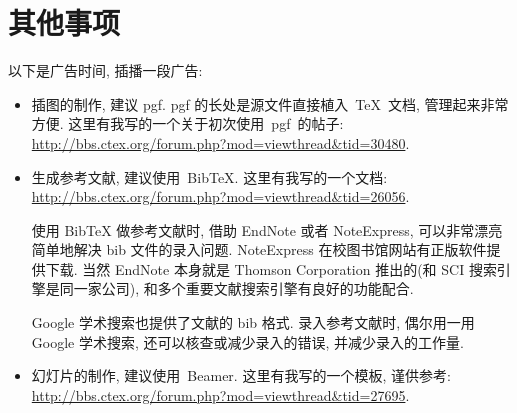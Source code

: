 \documentclass{WHUMaster}   %
\begin{document}

%







\chapter{其他事项}
以下是广告时间, 插播一段广告:
\begin{itemize}
		\item 插图的制作, 建议 pgf.
					pgf 的长处是源文件直接植入~\TeX~文档, 管理起来非常方便.
		这里有我写的一个关于初次使用~pgf~的帖子:\\    \url{http://bbs.ctex.org/forum.php?mod=viewthread&tid=30480}.
		\item 生成参考文献, 建议使用~BibTeX.  这里有我写的一个文档: \\
		\url{http://bbs.ctex.org/forum.php?mod=viewthread&tid=26056}.

			{\kaishu 使用 BibTeX{} 做参考文献时,
			借助 EndNote 或者 NoteExpress, 可以非常漂亮简单地解决 bib 文件的录入问题.
			NoteExpress 在校图书馆网站有正版软件提供下载.
			当然 EndNote 本身就是 Thomson Corporation 推出的(和 SCI 搜索引擎是同一家公司),
			和多个重要文献搜索引擎有良好的功能配合.

			Google 学术搜索也提供了文献的 bib 格式.
			录入参考文献时, 偶尔用一用 Google 学术搜索, 还可以核查或减少录入的错误, 并减少录入的工作量.}
		 \item 幻灯片的制作, 建议使用~Beamer. 这里有我写的一个模板, 谨供参考:\\
		\url{http://bbs.ctex.org/forum.php?mod=viewthread&tid=27695}.
\end{itemize}
\end{document}
